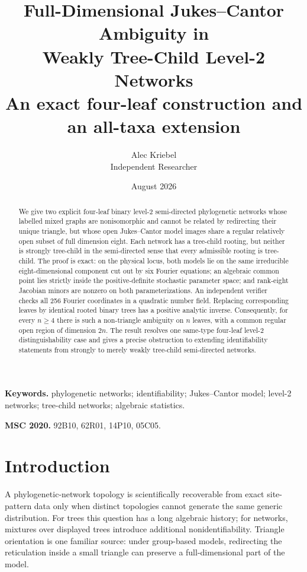 \documentclass[11pt]{article}
\title{Full-Dimensional Jukes--Cantor Ambiguity in\\
Weakly Tree-Child Level-2 Networks\\
\large An exact four-leaf construction and an all-taxa extension}
\author{Alec Kriebel\\\small Independent Researcher}
\date{August 2026}
\theoremstyle{remark}
\begin{document}
\maketitle

\begin{abstract}
We give two explicit four-leaf binary level-2 semi-directed phylogenetic
networks whose labelled mixed graphs are nonisomorphic and cannot be related
by redirecting their unique triangle, but whose open Jukes--Cantor model
images share a regular relatively open subset of full dimension eight.  Each
network has a tree-child rooting, but neither is strongly tree-child in the
semi-directed sense that every admissible rooting is tree-child.  The proof is
exact: on the physical locus, both models lie on the same irreducible
eight-dimensional component cut out by six Fourier equations; an algebraic
common point lies
strictly inside the positive-definite stochastic parameter space; and
rank-eight Jacobian minors are nonzero on both parameterizations.  An
independent verifier checks all 256 Fourier coordinates in a quadratic number
field.  Replacing corresponding leaves by identical rooted binary trees has
a positive analytic inverse.  Consequently, for every $n\ge4$ there is such
a non-triangle ambiguity on $n$ leaves, with a common regular open region of
dimension $2n$.  The result resolves one same-type four-leaf level-2
distinguishability case and gives a precise obstruction to extending
identifiability statements from strongly to merely weakly tree-child
semi-directed networks.
\end{abstract}

\noindent\textbf{Keywords.} phylogenetic networks; identifiability;
Jukes--Cantor model; level-2 networks; tree-child networks; algebraic
statistics.

\medskip
\noindent\textbf{MSC 2020.} 92B10, 62R01, 14P10, 05C05.

\section{Introduction}

A phylogenetic-network topology is scientifically recoverable from exact
site-pattern data only when distinct topologies cannot generate the same
generic distribution.  For trees this question has a long algebraic history;
for networks, mixtures over displayed trees introduce additional
nonidentifiability.  Triangle orientation is one familiar source: under
group-based models, redirecting the reticulation inside a small triangle can
preserve a full-dimensional part of the model.
\end{document}
